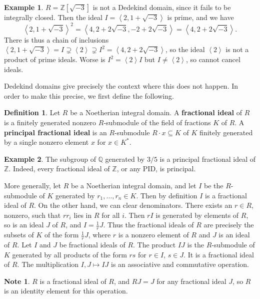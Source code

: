 \documentclass{article}
\newcommand{\Z}{\mathbb{Z}}
\newcommand{\Q}{\mathbb{Q}}
\renewcommand{\sb}[1]{\left[ #1 \right]}
\newcommand{\ab}[1]{\left\langle #1 \right\rangle}
\theoremstyle{definition}\newtheorem{definition}{Definition}[subsection]
\theoremstyle{definition}\newtheorem{remark}[definition]{Remark}
\theoremstyle{definition}\newtheorem*{example}{Example}
\theoremstyle{definition}\newtheorem*{note}{Note}
\begin{document}
\begin{example}
$ R = \Z\sb{\sqrt{-3}} $ is not a Dedekind domain, since it fails to be integrally closed. Then the ideal $ I = \ab{2, 1 + \sqrt{-3}} $ is prime, and we have
$$ \ab{2, 1 + \sqrt{-3}}^2 = \ab{4, 2 + 2\sqrt{-3}, -2 + 2\sqrt{-3}} = \ab{4, 2 + 2\sqrt{-3}}. $$
There is thus a chain of inclusions $ \ab{2, 1 + \sqrt{-3}} = I \supsetneq \ab{2} \supsetneq I^2 = \ab{4, 2 + 2\sqrt{-3}} $, so the ideal $ \ab{2} $ is not a product of prime ideals. Worse is $ I^2 = \ab{2}I $ but $ I \ne \ab{2} $, so cannot cancel ideals.
\end{example}

Dedekind domains give precisely the context where this does not happen. In order to make this precise, we first define the following.

\begin{definition}
Let $ R $ be a Noetherian integral domain. A \textbf{fractional ideal} of $ R $ is a finitely generated nonzero $ R $-submodule of the field of fractions $ K $ of $ R $. A \textbf{principal fractional ideal} is an $ R $-submodule $ R \cdot x \subseteq K $ of $ K $ finitely generated by a single nonzero element $ x $ for $ x \in K^* $.
\end{definition}

\begin{example}
The subgroup of $ \Q $ generated by $ 3 / 5 $ is a principal fractional ideal of $ \Z $. Indeed, every fractional ideal of $ \Z $, or any PID, is principal.
\end{example}

More generally, let $ R $ be a Noetherian integral domain, and let $ I $ be the $ R $-submodule of $ K $ generated by $ r_1, \dots, r_n \in K $. Then by definition $ I $ is a fractional ideal of $ R $. On the other hand, we can clear denominators. There exists an $ r \in R $, nonzero, such that $ rr_i $ lies in $ R $ for all $ i $. Then $ rI $ is generated by elements of $ R $, so is an ideal $ J $ of $ R $, and $ I = \tfrac{1}{r}J $. Thus the fractional ideals of $ R $ are precisely the subsets of $ K $ of the form $ \tfrac{1}{r}J $, where $ r $ is a nonzero element of $ R $ and $ J $ is an ideal of $ R $. Let $ I $ and $ J $ be fractional ideals of $ R $. The product $ IJ $ is the $ R $-submodule of $ K $ generated by all products of the form $ rs $ for $ r \in I $, $ s \in J $. It is a fractional ideal of $ R $. The multiplication $ I, J \mapsto IJ $ is an associative and commutative operation.

\begin{note}
$ R $ is a fractional ideal of $ R $, and $ RJ = J $ for any fractional ideal $ J $, so $ R $ is an identity element for this operation.
\end{note}
\end{document}
